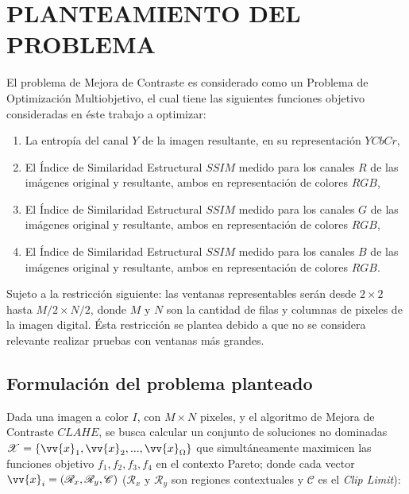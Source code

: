 \chapter{PLANTEAMIENTO DEL PROBLEMA}
\label{sec:proposal}

El problema de Mejora de Contraste es considerado como un Problema de Optimización Multiobjetivo, el cual tiene las siguientes funciones objetivo consideradas en éste trabajo a optimizar:

\begin{enumerate}
\item La entropía del canal $Y$ de la imagen resultante, en su representación $YCbCr$,
\item El Índice de Similaridad Estructural $SSIM$ medido para los canales $R$ de las imágenes original y resultante, ambos en representación de colores $RGB$,
\item El Índice de Similaridad Estructural $SSIM$ medido para los canales $G$ de las imágenes original y resultante, ambos en representación de colores $RGB$,
\item El Índice de Similaridad Estructural $SSIM$ medido para los canales $B$ de las imágenes original y resultante, ambos en representación de colores $RGB$.
\end{enumerate}

Sujeto a la restricción siguiente: las ventanas representables serán desde $2 \times 2$ hasta $M/2 \times N/2$, donde $M$ y $N$ son la cantidad de filas y columnas de pixeles de la imagen digital. Ésta restricción se plantea debido a que no se considera relevante realizar pruebas con ventanas más grandes.

\section{Formulación del problema planteado}\label{sec:formulation}

Dada una imagen a color $I$\label{symbol:ioriginal}, con $M \times N$ pixeles, y el algoritmo de Mejora de Contraste $CLAHE$, se busca calcular un conjunto de soluciones no dominadas  $\mathscr{X}=\{\vv{x}_1, \vv{x}_2,...,\vv{x}_{\Omega}\}$ que simultáneamente maximicen las funciones objetivo $f_1,f_2,f_3,f_4$ en el contexto Pareto; donde cada vector $\vv{x}_i=(\mathscr{R}_x,\mathscr{R}_y,\mathscr{C})$ ($\mathscr{R}_x$\label{symbol:claheventanax} y $\mathscr{R}_y$\label{symbol:claheventanay} son regiones contextuales y $\mathscr{C}$ es el \textit{Clip Limit}):

